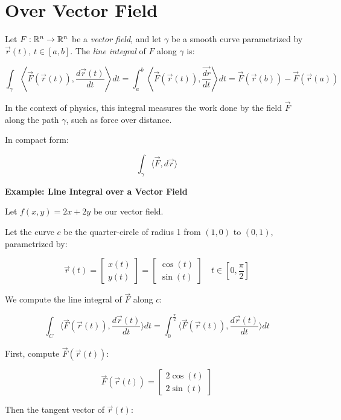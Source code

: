 \section{Over Vector Field}

Let \( F : \mathbb{R}^n \to \mathbb{R}^n \) be a \emph{vector field}, and let \( \gamma \) be a 
smooth curve parametrized by \( \vec{r}(t) \), \( t \in [a, b] \). 
The \emph{line integral} of \(F\) along \( \gamma \) is:

\[
    \int_\gamma \left\langle \vec{F}(\vec{r}(t)), \frac{d\vec{r}(t)}{dt} \right\rangle dt = 
    \int_a^b \left\langle \vec{F}(\vec{r}(t)), \frac{\vec{dr}}{dt} \right\rangle dt = \vec{F}(\vec{r}(b)) 
    - \vec{F}(\vec{r}(a))
\]

In the context of physics, this integral measures the work done by the field \( \vec{F} \) 
along the path \( \gamma \), such as force over distance.

In compact form:

\[
    \int_\gamma \langle \vec{F}, d\vec{r} \rangle
\]

\textbf{Example: Line Integral over a Vector Field}

Let \( f(x, y) = 2x + 2y \) be our vector field. 

Let the curve \(c\) be the quarter-circle of radius 1 from \( (1, 0) \) to \( (0, 1) \), 
parametrized by:

\[
    \vec{r}(t) = 
    \begin{bmatrix}
        x(t) \\ y(t)
    \end{bmatrix}
    =
    \begin{bmatrix}
    \cos(t) \\ \sin(t)
    \end{bmatrix}  
    \quad t \in \left[0, \frac{\pi}{2}\right]
\]

We compute the line integral of \( \vec{F} \) along \(c\):

\[
    \int_C \langle \vec{F}(\vec{r}(t)), \frac{d \vec{r}(t)}{dt}\rangle dt = 
    \int_0^{\frac{\pi}{2}} \langle\vec{F}(\vec{r}(t)), \frac{d \vec{r}(t)}{dt} \rangle dt
\]

First, compute \(\vec{F}(\vec{r}(t))\):

\[
    \vec{F}(\vec{r}(t)) = 
    \begin{bmatrix}
        2\cos(t) \\ 
        2\sin(t)
    \end{bmatrix}
\]

Then the tangent vector of \(\vec{r}(t)\):

